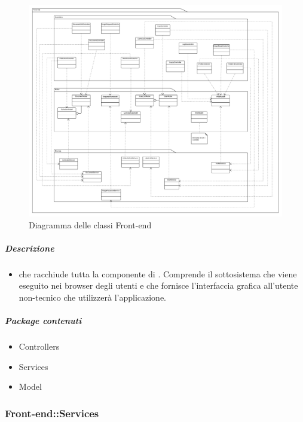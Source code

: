 		\begin{figure}[H] 
			\begin{center} 
				\includegraphics[width=\textwidth]{uml/classi/Front-end.png}  
				\caption{Diagramma delle classi Front-end}
			\end{center}  
		\end{figure} 
		
	\subparagraph{Descrizione} 
		\begin{itemize}
		\item[]  che racchiude tutta la componente di . Comprende il sottosistema che viene eseguito nei browser degli utenti e che fornisce l'interfaccia grafica all'utente non-tecnico che utilizzerà l'applicazione.
		\end{itemize} 
		\subparagraph{Package contenuti} 
		\begin{itemize}
				\item Controllers
				\item Services
				\item Model
		\end{itemize}
	\subsubsection{Front-end::Services}
